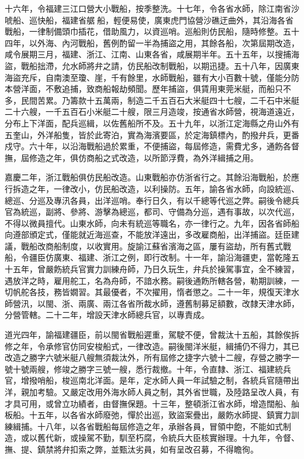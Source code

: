 \begin{pinyinscope}
十六年，令福建三江口營大小戰船，按季整洗。十七年，令各省水師，除江南省沙唬船、巡快船，福建省艍船，輕便易使，廣東虎門協營沙礁迂曲外，其沿海各省戰船，一律制備頭巾插花，借助風力，以資巡哨。巡船則仿民船，隨時修整。五十四年，以外海、內河戰船，舊例酌留一半為捕盜之用，其餘各船，次第屆期改造，咸令展期三月，福建、浙江、江南、山東各省，咸展期半年。五十五年，以搜捕海盜，戰船拙滯，允水師將弁之請，仿民船改制戰船，以期迅捷。五十八年，因廣東海盜充斥，自南澳至瓊、崖，千有餘里，水師戰船，雖有大小百數十號，僅能分防本營洋面，不敷追捕，致商船報劫頻聞。歷年捕盜，俱賃用東莞米艇，而船只不多，民間苦累。乃籌款十五萬兩，制造二千五百石大米艇四十七艘，二千石中米艇二十六艘，一千五百石小米艇二十艘，限三月造竣，按通省水師營，視海道遠近，分布上下洋面，配兵巡緝，以佐舊船所不及。五十九年，以浙江定海縣之舟山外有五奎山，外洋船隻，皆於此寄泊，實為海濱要區，於定海鎮標內，酌撥弁兵，更番戍守。六十年，以沿海戰船過於累重，不便捕盜，每屆修造，需費尤多，通飭各督撫，屆修造之年，俱仿商船之式改造，以所節浮費，為外洋緝捕之用。

嘉慶二年，浙江戰船俱仿民船改造。山東戰船亦仿浙省行之。其餘沿海戰船，於應行拆造之年，一律改小，仿民船改造，以利操防。五年，諭各省水師，向設統巡、總巡、分巡及專汛各員，出洋巡哨。奉行日久，有以千總等代巡之弊。嗣後令總兵官為統巡，副將、參將、游擊為總巡，都司、守備為分巡，遇有事故，以次代巡，不得以微員擅代。山東水師，向未有統巡等職名，亦一律行之。九年，因各省師船向遵部頒定式，僅能就近海巡查，不能放洋遠出，多改雇商船，出洋捕盜。廷臣建議，戰船改商船制度，以收實用。旋諭江蘇省濱海之區，屢有盜劫，所有舊式戰船，令疆臣仿廣東、福建、浙江之例，即行改制。十一年，諭沿海疆吏，當乾隆五十五年，曾嚴飭統兵官實力訓練舟師，乃日久玩生，弁兵於操駕事宜，全不練習，遇放洋之時，雇用舵工，名為舟師，不諳水務。嗣後通飭所轄各營，勒期訓練，一切帆舵各技，務皆嫺習。其最優者，不次擢用，惰者懲之。二十一年，規復天津水師營汛，以閩、浙、兩廣、兩江各省所裁水師，遵舊制募足額數，改隸天津水師，分營管轄。二十二年，增設天津水師總兵官，以專責成。

道光四年，諭福建疆臣，前以閩省戰船遲重，駕駛不便，曾裁汰十五船，其餘俟拆修之年，令承修官仿同安梭船式，一律改造。嗣後閩洋米艇，緝捕仍不得力，其已改造之勝字六號米艇八艘無須裁汰外，所有屆修之捷字六號十二艘，存營之勝字一號十號兩艘，修竣之勝字三號一艘，悉行裁撤。十年，令直隸、浙江、福建統兵官，增撥哨船，梭巡南北洋面。是年，定水師人員一年試驗之制，各統兵官隨帶出洋，親加考驗。又嚴定改用外海水師人員之制，其外省世職，及陸路呈改人員，有才具可用，或曾立功績者，由督撫保題。十三年，整頓浙江省水師，增造闊船、舢板船。十五年，以各省水師廢弛，憚於出巡，致盜案疊出，嚴飭水師提、鎮實力訓練緝捕。十八年，以各省戰船每屆修造之年，承辦各員，冒領中飽，不能如式制造，或以舊代新，或操駕不勤，馴至朽腐，令統兵大臣核實辦理。十九年，令督、撫、提、鎮禁將弁扣索之弊，並甄汰劣員，如有呈改召募，不得瞻徇。


\end{pinyinscope}
